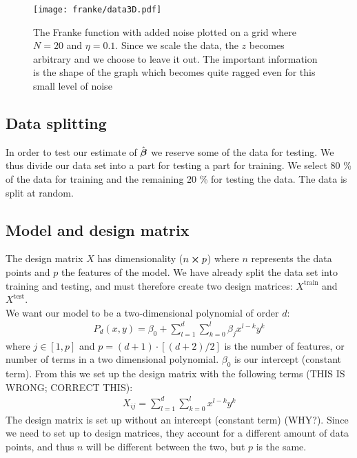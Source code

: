         \begin{figure}
            \texttt{[image: franke/data3D.pdf]}
            \caption{The Franke function with added noise plotted on a grid where $N=20$ and $\eta=0.1$. Since we scale the data, the $z$ becomes arbitrary and we choose to leave it out. The important information is the shape of the graph which becomes quite ragged even for this small level of noise}
            \label{fig:franke_function_noise}
        \end{figure}

    \subsection{Data splitting}\label{sec:splitting}
        In order to test our estimate of $\hat{\boldsymbol{\beta}}$ we reserve some of the data for testing. We thus divide our data set into a part for testing a part for training. We select 80 \% of the data for training and the remaining 20 \% for testing the data. The data is split at random. 




    \subsection{Model and design matrix}\label{sec:model}
        The design matrix $X$ has dimensionality ($n\cross p$) where $n$ represents the data points and $p$ the features of the model. We have already split the data set into training and testing, and must therefore create two design matrices: $X^{\text{train}}$ and $X^{\text{test}}$. 
        \\
        We want our model to be a two-dimensional polynomial of order $d$:
        \begin{align*}
            P_d(x,y) = \beta_0 + \sum_{l=1}^d\sum_{k=0}^{l} \beta_jx^{l-k}y^k
        \end{align*}
        where $j\in[1,p]$ and $p=(d+1)\cdot\left[(d+2)/2\right]$ is the number of features, or number of terms in a two dimensional polynomial. $\beta_0$ is our intercept (constant term). From this we set up the design matrix with the following terms (THIS IS WRONG; CORRECT THIS):
        \begin{align}\label{eq:designmatrixequation}
            X_{ij} = \sum_{l=1}^d\sum_{k=0}^{l} x^{l-k}y^k
        \end{align}
        The design matrix is set up without an intercept (constant term) (WHY?). Since we need to set up to design matrices, they account for a different amount of data points, and thus $n$ will be different between the two, but $p$ is the same. 





